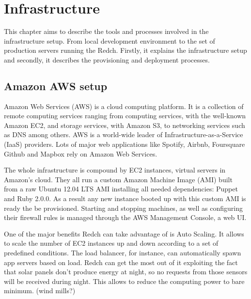 \chapter{Infrastructure}

This chapter aims to describe the tools and processes involved in the infrastructure setup. From local development environment to the set of production servers running the Redch. Firstly, it explains the infrastructure setup and secondly, it describes the provisioning and deployment processes.

\section{Amazon AWS setup}

Amazon Web Services (AWS) is a cloud computing platform. It is a collection of remote computing services ranging from computing services, with the well-known Amazon EC2, and storage services, with Amazon S3, to networking services such as DNS among others. AWS is a world-wide leader of Infrastructure-as-a-Service (IaaS) providers. Lots of major web applications like Spotify, Airbnb, Foursquare Github and Mapbox rely on Amazon Web Services.

The whole infrastructure is compound by EC2 instances, virtual servers in Amazon's cloud. They all run a custom Amazon Machine Image (AMI) built from a raw Ubuntu 12.04 LTS AMI installing all needed dependencies: Puppet and Ruby 2.0.0. As a result any new instance booted up with this custom AMI is ready the be provisioned. Starting and stopping machines, as well as configuring their firewall rules is managed through the AWS Management Console, a web UI.

One of the major benefits Redch can take advantage of is Auto Scaling. It allows to scale the number of EC2 instances up and down according to a set of predefined conditions. The load balancer, for instance, can automatically spawn app servers based on load. Redch can get the most out of it exploiting the fact that solar panels don't produce energy at night, so no requests from those sensors will be received during night. This allows to reduce the computing power to bare minimum. (wind mills?)

